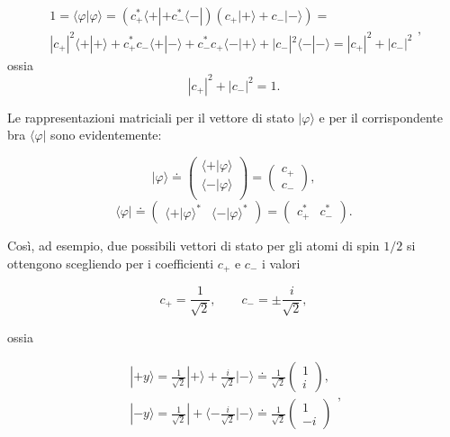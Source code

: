 \documentclass[a4paper,12pt,oneside]{book}
\begin{document}
\begin{equation}
\begin{array}{c}
1=\langle \varphi | \varphi \rangle = (c^*_+\langle + | +c^*_- \langle - |)(c_+| + \rangle +c_- | - \rangle)=\\
| c_+|^2\langle + | + \rangle +c^*_+c_- \langle + | - \rangle +c^*_-c_+ \langle - | + \rangle +|c_-|^2 \langle - | - \rangle =|c_+|^2+|c_-|^2
\end{array} ,
\end{equation}
ossia 
\begin{equation}
|c_+|^2+|c_-|^2=1 .
\end{equation}

Le rappresentazioni matriciali per il vettore di stato $| \varphi \rangle $ e per il corrispondente bra $\langle \varphi |$ sono evidentemente:

\begin{equation}
 | \varphi \rangle \doteq
\begin{pmatrix}
\langle + | \varphi \rangle\\
\langle - | \varphi \rangle \\
\end{pmatrix} = 
\begin{pmatrix}
c_+ \\
c_-
\end{pmatrix} ,
\end{equation}
\begin{equation}
\langle \varphi | \doteq
\begin{pmatrix}
\langle + | \varphi \rangle ^* &
\langle - | \varphi \rangle ^* 
\end{pmatrix} = 
\begin{pmatrix}
c^*_+ & c^*_-
\end{pmatrix} .
\end{equation}

Così, ad esempio, due possibili vettori di stato per gli atomi di spin $1/2$ si ottengono scegliendo per i coefficienti $c_+$ e $c_-$ i valori

\begin{equation}
c_+=\frac{1}{\sqrt{2}}, \qquad c_-=\pm \frac{i}{\sqrt{2}} ,
\end{equation}

ossia

\begin{equation}
\begin{array}{c}
|+y \rangle = \frac{1}{\sqrt{2}}|+ \rangle +\frac{i}{\sqrt{2}}| - \rangle \doteq \frac{1}{\sqrt{2}}
\begin{pmatrix}
1 \\
i
\end{pmatrix} ,\\
| -y \rangle = \frac{1}{\sqrt{2}}| + \langle -\frac{i}{\sqrt{2}}| - \rangle \doteq \frac{1}{\sqrt{2}}
\begin{pmatrix}
1 \\
-i
\end{pmatrix}
\end{array} ,
\label{cap3_15}
\end{equation}
\end{document}
